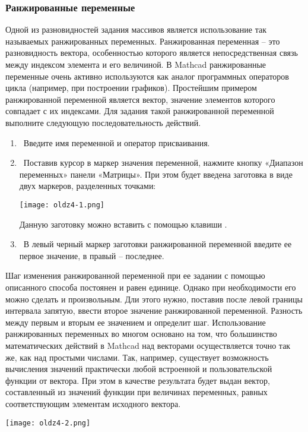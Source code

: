 \subsubsection*{Ранжированные переменные}
Одной из разновидностей задания массивов является использование так называемых ранжированных переменных. Ранжированная переменная – это разновидность вектора, особенностью которого является непосредственная связь между индексом элемента и его величиной. В Mathcad ранжированные переменные очень активно используются как аналог программных операторов цикла (например, при построении графиков).
Простейшим примером ранжированной переменной является вектор, значение элементов которого совпадает с их индексами. Для задания такой ранжированной переменной выполните следующую последовательность действий.
\begin{enumerate}
	\item Введите имя переменной и оператор присваивания.
	\item  Поставив курсор в маркер значения переменной, нажмите кнопку «Диапазон переменных» панели «Матрицы». При этом будет введена заготовка в виде двух маркеров, разделенных точками:
	\begin{center}
		\texttt{[image: oldz4-1.png]}
	\end{center}
		
	Данную заготовку можно вставить с помощью клавиши \keys{;}.
	
	\item  В левый черный маркер заготовки ранжированной переменной введите ее первое значение, в правый – последнее.
\end{enumerate}

Шаг изменения ранжированной переменной при ее задании с помощью описанного способа постоянен и равен единице. Однако при необходимости его можно сделать и произвольным. Дли этого нужно, поставив после левой границы интервала запятую, ввести второе значение ранжированной переменной. Разность между первым и вторым ее значением и определит шаг. 
Использование ранжированных переменных во многом основано на том, что большинство математических действий в Mathcad над векторами осуществляется точно так же, как над простыми числами. Так, например, существует возможность вычисления значений практически любой встроенной и пользовательской функции от вектора. При этом в качестве результата будет выдан вектор, составленный из значений функции при величинах переменных, равных соответствующим элементам исходного вектора.

\begin{center}
	\texttt{[image: oldz4-2.png]}
\end{center}

